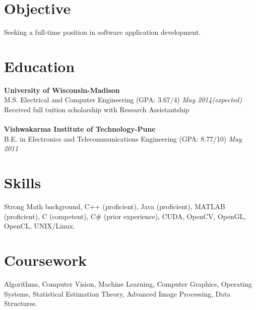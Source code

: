 \documentclass[margin]{res}
\begin{document}
 

 

\address{thite@wisc.edu\\www.linkedin.com/in/aashishthite\\https://github.com/aashishthite‎}
\address{\hfill 2110 University Avenue, Apt. 104, \\ \hfill Madison, WI-53726, USA.\\ \hfill (408) 601-9349}

 
\begin{resume} 
 
\section{Objective} 
Seeking a full-time position in software application development.%

\section{Education} 
{\bf University of Wisconsin-Madison} \\
M.S. Electrical and Computer Engineering (GPA: 3.67/4) \hfill {\it May 2014(expected)} \\
Received full tuition scholarship with Research Assistantship \\
\\
{\bf Vishwakarma Institute of Technology-Pune} \\
B.E. in Electronics and Telecommunications Engineering (GPA: 8.77/10) \hfill {\it May 2011}

\section{Skills}
Strong Math background, C++ (proficient), Java (proficient), MATLAB (proficient), C (competent), C\# (prior experience), CUDA, OpenCV, OpenGL, OpenCL, UNIX/Linux.

\section{Coursework}
Algorithms, Computer Vision, Machine Learning, Computer Graphics, Operating Systems, Statistical Estimation Theory, Advanced Image Processing, Data Structures.


\end{resume}
\end{document}

